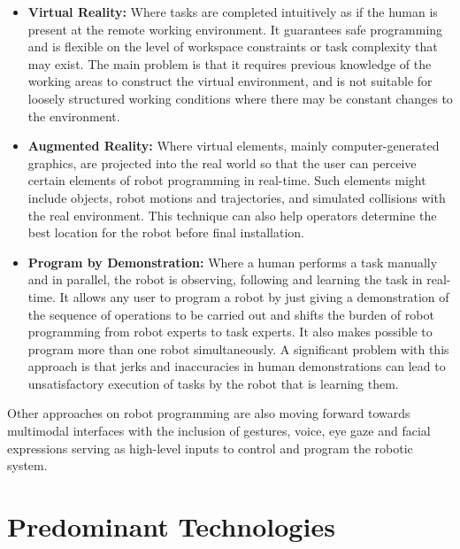 \begin{itemize}
    \item \textbf{Virtual Reality: }Where tasks are completed intuitively as if the human is present at the remote working environment. It guarantees safe programming and is flexible on the level of workspace constraints or task complexity that may exist. The main problem is that it requires previous knowledge of the working areas to construct the virtual environment, and is not suitable for loosely structured working conditions where there may be constant changes to the environment.
    \item \textbf{Augmented Reality: }Where virtual elements, mainly computer-generated graphics, are projected into the real world so that the user can perceive certain elements of robot programming in real-time. Such elements might include objects, robot motions and trajectories, and  simulated collisions with the real environment. This technique can also help operators determine the best location for the robot before final installation.
    \item \textbf{Program by Demonstration: }Where a human performs a task manually and in parallel, the robot is observing, following and learning the task in real-time. It allows any user to program a robot by just giving a demonstration of the sequence of operations to be carried out and shifts the burden of robot programming from robot experts to task experts. It also makes possible to program more than one robot simultaneously. A significant problem with this approach is that jerks and inaccuracies in human demonstrations can lead to unsatisfactory execution of tasks by the robot that is learning them.
\end{itemize}

\par Other approaches on robot programming are also moving forward towards multimodal interfaces with the inclusion of gestures, voice, eye gaze and facial expressions serving as high-level inputs to control and program the robotic system.






\section{Predominant Technologies}

